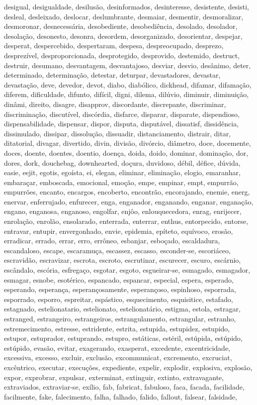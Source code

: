 desigual, desigualdade, desilusão, desinformados, desinteresse, desistente, desisti, desleal, desleixado, deslocar, deslumbrante, desmaiar, desmentir, desmoralizar, desmoronar, desnecessária, desobediente, desobediência, desolado, desolador, desolação, desonesto, desonra, desordem, desorganizado, desorientar, despejar, desperat, despercebido, despertaram, despesa, despreocupado, desprezo, desprezível, desproporcionada, desprotegido, desprovido, destemido, destruct, destruir, desumano, desvantagem, desvantajoso, desviar, desvio, desânimo, deter, determinado, determinação, detestar, deturpar, devastadores, devastar, devastação, deve, devedor, devot, diabo, diabólico, dickhead, difamar, difamação, diferem, dificuldade, difunto, difícil, digni, dilema, dilúvio, diminuir, diminuição, dinâmi, direito, disagre, disapprov, discordante, discrepante, discriminar, discriminação, discutível, discórdia, disfarce, disparar, disparate, dispendioso, dispensabilidade, dispensar, dispor, disputa, disputável, dissatisf, dissidência, dissimulado, dissipar, dissolução, dissuadir, distanciamento, distrair, ditar, ditatorial, divagar, divertido, divin, divisão, divórcio, diâmetro, doce, docemente, doces, doente, doentes, doentio, doença, doida, doido, dominar, dominação, dor, dores, dork, douchebag, downhearted, doçura, duvidoso, débil, défice, dúvida, easie, eejit, egotis, egoísta, ei, elegan, eliminar, eliminação, elogio, emaranhar, embaraçar, emboscada, emocional, emoção, empe, empinar, empt, empurrão, empurrões, encanto, encargos, encoberto, encontrão, encorajando, enemie, energ, enervar, enferrujado, enfurecer, enga, enganador, enganando, enganar, enganação, engano, enganosa, enganoso, engolfar, enjôo, enlouquecedora, enrag, enrijecer, enrolação, enrolão, ensolarado, enterrada, enterrar, enthus, entorpecido, entorse, entravar, entupir, envergonhado, envie, epidemia, epíteto, equívoco, erosão, erradicar, errado, errar, erro, errôneo, esbanjar, esboçado, escaldadura, escandaloso, escape, escaramuça, escassez, escasso, esconder-se, escoriáceo, escravidão, escravizar, escrota, escroto, escrutinar, escurecer, escuro, escárnio, escândalo, escória, esfregaço, esgotar, esgoto, esgueirar-se, esmagado, esmagador, esmagar, esnobe, esotérico, espancado, espancar, especial, espera, esperado, esperando, esperança, esperançosamente, esperançoso, espinhoso, esporrada, esporrado, esporro, espreitar, espástico, esquecimento, esquisitice, estafado, estagnado, estelionatario, estelionato, estelionatário, estigma, estola, estragar, estranged, estrangeiro, estrangeiros, estrangulamento, estrangular, estranho, estremecimento, estresse, estridente, estrita, estupida, estupidez, estupido, estupor, estuprador, estuprando, estupro, estáticas, estéril, estúpida, estúpido, estúpido, evasão, evitar, exagerando, exasperat, excedente, excentricidade, excessiva, excesso, excluir, exclusão, excommunicat, excremento, excruciat, \\ excêntrico, executar, execuções, expediente, expelir, explodir, explosiva, explosão, expor, exprobrar, expulsar, exterminat, extinguir, extinto, extravagante, extraviados, extraviar-se, exílio, fab, fabricat, fabuloso, faca, facada, facilidade, facilmente, fake, falecimento, falha, falhado, falido, fallout, falsear, falsidade, 